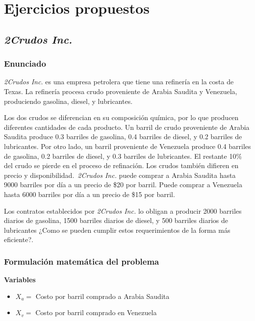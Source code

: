 \documentclass[conference]{IEEEtran}
\begin{document}
\section{Ejercicios propuestos}

\subsection{\textit{2Crudos Inc.}}

\subsubsection{Enunciado}

\textit{2Crudos Inc.} es una empresa petrolera que tiene una refinería en
la costa de Texas. La refinería procesa crudo proveniente de Arabia Saudita y
Venezuela, produciendo gasolina, diesel, y lubricantes.

Los dos crudos se diferencian en su composición química, por lo que
producen diferentes cantidades de cada producto. Un barril de crudo
proveniente de Arabia Saudita produce 0.3 barriles de gasolina, 0.4 barriles
de diesel, y 0.2 barriles de lubricantes. Por otro lado, un barril proveniente
de Venezuela produce 0.4 barriles de gasolina, 0.2 barriles de diesel, y
0.3 barriles de lubricantes. El restante 10\% del crudo se pierde en el
proceso de refinación. Los crudos también difieren en precio y
disponibilidad.~\textit{2Crudos Inc.} puede comprar a Arabia Saudita hasta 9000
barriles por día a un precio de \$20 por barril. Puede comprar a Venezuela
hasta 6000 barriles por día a un precio de \$15 por barril.

Los contratos establecidos por \textit{2Crudos Inc.} lo obligan a producir 2000
barriles diarios de gasolina, 1500 barriles diarios de diesel, y 500
barriles diarios de lubricantes ¿Como se pueden cumplir estos requerimientos
de la forma más eficiente?.

\subsubsection{Formulación matemática del problema}

\hfil{}

\textbf{Variables}

\begin{itemize}
    \item $X_{a} = $ Costo por barril comprado a Arabia Saudita
    \item $X_{v} = $ Costo por barril comprado en Venezuela
\end{itemize}
\end{document}
